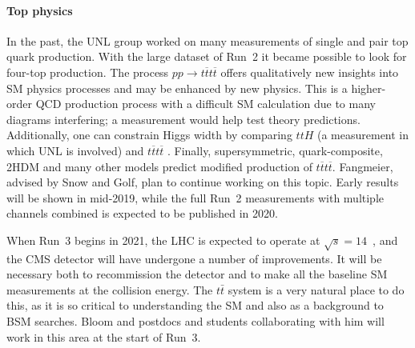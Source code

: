 \paragraph{Top physics}
%

In the past, the UNL group worked on many measurements of single and pair top quark production. With the large dataset of Run~2 it became possible to look for four-top production. The process $pp\to t\overline{t}t\overline{t}$ offers qualitatively new insights into SM physics processes and may be enhanced by new physics. This is a higher-order QCD production process with a difficult SM calculation due to many diagrams interfering; a measurement would help test theory predictions. Additionally, one can constrain Higgs width by comparing $ttH$ (a measurement in which UNL is involved) and $t\overline{t}t\overline{t}$ \cite{bib:Higgs-width-tttt}. Finally, supersymmetric, quark-composite, 2HDM and many other models predict modified production of $t\overline{t}t\overline{t}$. Fangmeier, advised by Snow and Golf, plan to continue working on this topic. Early results will be shown in mid-2019, while the full Run~2 measurements with multiple channels combined is expected to be published in 2020.

When Run~3 begins in 2021, the LHC is expected to operate at $\sqrt{s} = 14$~\TeV, and the CMS detector will have undergone a number of improvements.  It will be necessary both to recommission the detector and to make all the baseline SM measurements at the collision energy.  The $t\bar{t}$ system is a very natural place to do this, as it is so critical to understanding the SM and also as a background to BSM searches.  Bloom and postdocs and students collaborating with him will work in this area at the start of Run~3.

